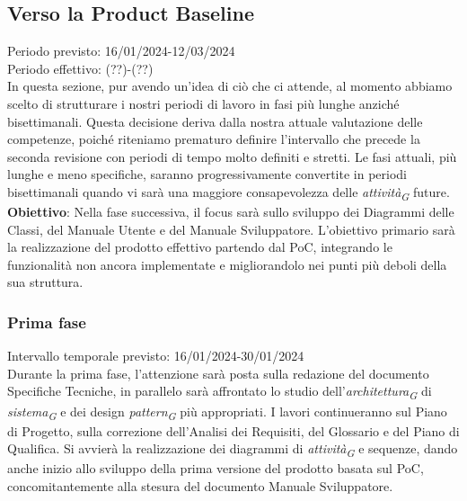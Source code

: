 \subsection{Verso la Product Baseline}
Periodo previsto: 16/01/2024-12/03/2024\\ 
\vspace{0.2cm} 
Periodo effettivo: (??)-(??)\\ 
\vspace{0.2cm} 
In questa sezione, pur avendo un'idea di ciò che ci attende, al momento abbiamo scelto di strutturare i nostri periodi di lavoro in fasi più lunghe anziché bisettimanali. Questa decisione deriva dalla nostra attuale valutazione delle competenze, poiché riteniamo prematuro definire l'intervallo che precede la seconda revisione con periodi di tempo molto definiti e stretti. 
Le fasi attuali, più lunghe e meno specifiche, saranno progressivamente convertite in periodi bisettimanali quando vi sarà una maggiore consapevolezza delle \textit{attività}\textsubscript{\textit{G}} future.  
\\ 
\vspace{0.2cm} 
\textbf{Obiettivo}: Nella fase successiva, il focus sarà sullo sviluppo dei Diagrammi delle Classi, del Manuale Utente e del Manuale Sviluppatore. L'obiettivo primario sarà la realizzazione del prodotto effettivo partendo dal PoC, integrando le funzionalità non ancora implementate e migliorandolo nei punti più deboli della sua struttura.\\ 
\vspace{0.2cm} 

\subsubsection{Prima fase}
Intervallo temporale previsto: 16/01/2024-30/01/2024\\ 
\vspace{0.2cm} 
Durante la prima fase, l'attenzione sarà posta sulla redazione del documento Specifiche Tecniche, in parallelo sarà affrontato lo studio dell'\textit{architettura}\textsubscript{\textit{G}} di \textit{sistema}\textsubscript{\textit{G}} e dei design \textit{pattern}\textsubscript{\textit{G}} più appropriati. I lavori continueranno sul Piano di Progetto, sulla correzione dell'Analisi dei Requisiti, del Glossario e del Piano di Qualifica. Si avvierà la realizzazione dei diagrammi di \textit{attività}\textsubscript{\textit{G}} e sequenze, dando anche inizio allo sviluppo della prima versione del prodotto basata sul PoC, concomitantemente alla stesura del documento Manuale Sviluppatore.


